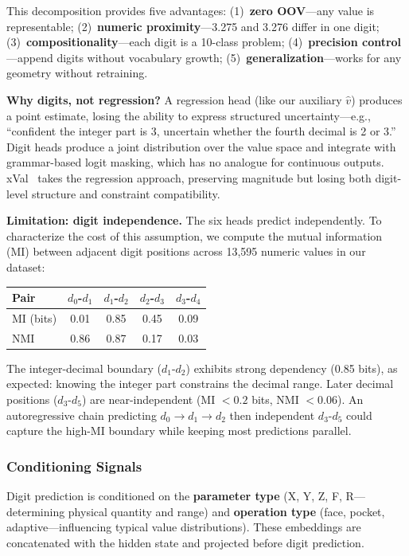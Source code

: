 \documentclass[11pt]{article}
\begin{document}
This decomposition provides five advantages: (1)~\textbf{zero OOV}---any value is representable; (2)~\textbf{numeric proximity}---3.275 and 3.276 differ in one digit; (3)~\textbf{compositionality}---each digit is a 10-class problem; (4)~\textbf{precision control}---append digits without vocabulary growth; (5)~\textbf{generalization}---works for any geometry without retraining.

\textbf{Why digits, not regression?} A regression head (like our auxiliary $\hat{v}$) produces a point estimate, losing the ability to express structured uncertainty---e.g., ``confident the integer part is 3, uncertain whether the fourth decimal is 2 or 3.'' Digit heads produce a joint distribution over the value space and integrate with grammar-based logit masking, which has no analogue for continuous outputs. xVal~\cite{xval} takes the regression approach, preserving magnitude but losing both digit-level structure and constraint compatibility.

\textbf{Limitation: digit independence.} The six heads predict independently. To characterize the cost of this assumption, we compute the mutual information (MI) between adjacent digit positions across 13{,}595 numeric values in our dataset:

\begin{center}
\scriptsize
\begin{tabular}{@{}lcccc@{}}
\toprule
\textbf{Pair} & $d_0$-$d_1$ & $d_1$-$d_2$ & $d_2$-$d_3$ & $d_3$-$d_4$ \\
\midrule
MI (bits)  & 0.01 & 0.85 & 0.45 & 0.09 \\
NMI        & 0.86 & 0.87 & 0.17 & 0.03 \\
\bottomrule
\end{tabular}
\end{center}

\noindent The integer-decimal boundary ($d_1$-$d_2$) exhibits strong dependency (0.85 bits), as expected: knowing the integer part constrains the decimal range. Later decimal positions ($d_3$-$d_5$) are near-independent (MI $< 0.2$ bits, NMI $< 0.06$). An autoregressive chain predicting $d_0 \to d_1 \to d_2$ then independent $d_3$-$d_5$ could capture the high-MI boundary while keeping most predictions parallel.

\subsubsection{Conditioning Signals}

Digit prediction is conditioned on the \textbf{parameter type} (X, Y, Z, F, R---determining physical quantity and range) and \textbf{operation type} (face, pocket, adaptive---influencing typical value distributions). These embeddings are concatenated with the hidden state and projected before digit prediction.
\end{document}
